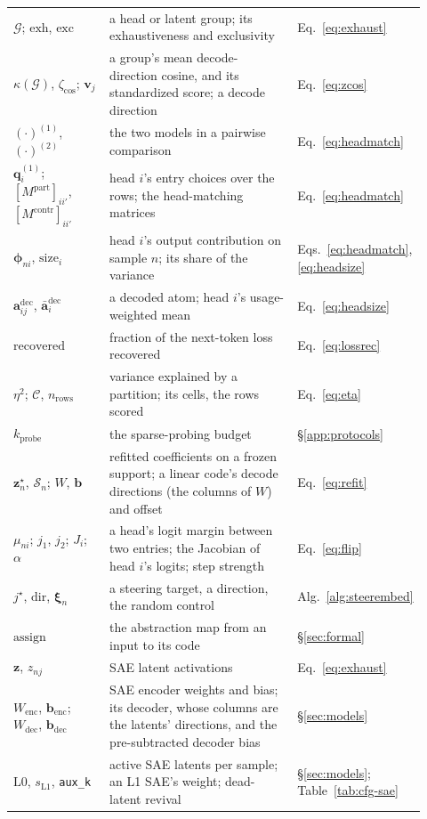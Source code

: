 \begin{longtable}{@{}>{\raggedright\arraybackslash}p{0.25\linewidth}%
>{\raggedright\arraybackslash}p{0.52\linewidth}%
>{\raggedright\arraybackslash}p{0.15\linewidth}@{}}
$\mathcal{G}$; $\mathrm{exh}$, $\mathrm{exc}$ & a head or latent group; its exhaustiveness and exclusivity & Eq.~\eqref{eq:exhaust} \\
$\kappa(\mathcal{G})$, $\zeta_{\cos}$; $\mathbf{v}_j$ & a group's mean decode-direction cosine, and its standardized score; a decode direction & Eq.~\eqref{eq:zcos} \\
$(\cdot)^{(1)}$, $(\cdot)^{(2)}$ & the two models in a pairwise comparison & Eq.~\eqref{eq:headmatch} \\
$\mathbf{q}^{(1)}_i$; $[M^{\mathrm{part}}]_{ii'}$, $[M^{\mathrm{contr}}]_{ii'}$ & head $i$'s entry choices over the rows; the head-matching matrices & Eq.~\eqref{eq:headmatch} \\
$\boldsymbol{\phi}_{ni}$, $\mathrm{size}_i$ & head $i$'s output contribution on sample $n$; its share of the variance & Eqs.~\eqref{eq:headmatch}, \eqref{eq:headsize} \\
$\mathbf{a}^{\mathrm{dec}}_{ij}$, $\bar{\mathbf{a}}^{\mathrm{dec}}_i$ & a decoded atom; head $i$'s usage-weighted mean & Eq.~\eqref{eq:headsize} \\
$\mathrm{recovered}$ & fraction of the next-token loss recovered & Eq.~\eqref{eq:lossrec} \\
$\eta^2$; $\mathcal{C}$, $n_{\mathrm{rows}}$ & variance explained by a partition; its cells, the rows scored & Eq.~\eqref{eq:eta} \\
$k_{\mathrm{probe}}$ & the sparse-probing budget & §\ref{app:protocols} \\
$\mathbf{z}^\star_n$, $\mathcal{S}_n$; $W$, $\mathbf{b}$ & refitted coefficients on a frozen support; a linear code's decode directions (the columns of $W$) and offset & Eq.~\eqref{eq:refit} \\
$\mu_{ni}$; $j_1$, $j_2$; $J_i$; $\alpha$ & a head's logit margin between two entries; the Jacobian of head $i$'s logits; step strength & Eq.~\eqref{eq:flip} \\
$j^\star$, $\mathrm{dir}$, $\boldsymbol{\xi}_n$ & a steering target, a direction, the random control & Alg.~\ref{alg:steerembed} \\
$\mathrm{assign}$ & the abstraction map from an input to its code & §\ref{sec:formal} \\
$\mathbf{z}$, $z_{nj}$ & SAE latent activations & Eq.~\eqref{eq:exhaust} \\
$W_{\mathrm{enc}}$, $\mathbf{b}_{\mathrm{enc}}$; $W_{\mathrm{dec}}$, $\mathbf{b}_{\mathrm{dec}}$ & SAE encoder weights and bias; its decoder, whose columns are the latents' directions, and the pre-subtracted decoder bias & §\ref{sec:models} \\
$\mathrm{L0}$, $s_{\mathrm{L1}}$, \texttt{aux\_k} & active SAE latents per sample; an L1 SAE's weight; dead-latent revival & §\ref{sec:models}; Table~\ref{tab:cfg-sae} \\
\end{longtable}
\endgroup

